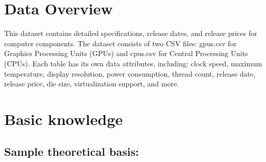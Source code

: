 \documentclass{article}
\begin{document}
	\section{Data Overview}
	This dataset contains detailed specifications, release dates, and release prices for computer components. The dataset consists of two CSV files: gpus.csv for Graphics Processing Units (GPUs) and cpus.csv for Central Processing Units (CPUs). Each table has its own data attributes, including: clock speed, maximum temperature, display resolution, power consumption, thread count, release date, release price, die size, virtualization support, and more.
	\section{Basic knowledge}
	\subsection{Sample theoretical basis:}
\end{document}
